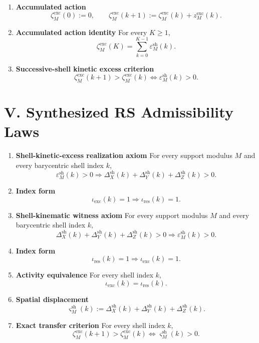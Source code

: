 \documentclass[11pt,letterpaper]{article}
\theoremstyle{plain}
\theoremstyle{definition}
\theoremstyle{remark}
\newcommand{\ExcIndex}{\iota}
\newcommand{\SpatDisp}{\varsigma}
\newcommand{\KinExcess}{\varepsilon}
\newcommand{\AccAction}{\zeta}
\begin{document}
\begin{enumerate}[resume]
\item \textbf{Accumulated action}
\[
\AccAction_M^{\mathrm{exc}}(0):=0,\qquad
\AccAction_M^{\mathrm{exc}}(k+1):=\AccAction_M^{\mathrm{exc}}(k)+z_M^{\mathrm{exc}}(k).
\]

\item \textbf{Accumulated action identity}
For every \(K\ge 1\),
\[
\AccAction_M^{\mathrm{exc}}(K)=\sum_{k=0}^{K-1}\KinExcess_M^{\mathrm{sh}}(k).
\]

\item \textbf{Successive-shell kinetic excess criterion}
\[
\AccAction_M^{\mathrm{exc}}(k+1)>\AccAction_M^{\mathrm{exc}}(k)
\iff
\KinExcess_M^{\mathrm{sh}}(k)>0.
\]
\end{enumerate}

\section*{V. Synthesized RS Admissibility Laws}

\begin{enumerate}[resume]
\item \textbf{Shell-kinetic-excess realization axiom}
For every support modulus \(M\) and every barycentric shell index \(k\),
\[
\KinExcess_M^{\mathrm{sh}}(k)>0
\Longrightarrow
\Delta_X^{\mathrm{sh}}(k)+\Delta_Y^{\mathrm{sh}}(k)+\Delta_Z^{\mathrm{sh}}(k)>0.
\]

\item \textbf{Index form}
\[
\ExcIndex_{\mathrm{exc}}(k)=1
\Longrightarrow
\ExcIndex_{\mathrm{res}}(k)=1.
\]

\item \textbf{Shell-kinematic witness axiom}
For every support modulus \(M\) and every barycentric shell index \(k\),
\[
\Delta_X^{\mathrm{sh}}(k)+\Delta_Y^{\mathrm{sh}}(k)+\Delta_Z^{\mathrm{sh}}(k)>0
\Longrightarrow
\KinExcess_M^{\mathrm{sh}}(k)>0.
\]

\item \textbf{Index form}
\[
\ExcIndex_{\mathrm{res}}(k)=1
\Longrightarrow
\ExcIndex_{\mathrm{exc}}(k)=1.
\]

\item \textbf{Activity equivalence}
For every shell index \(k\),
\[
\ExcIndex_{\mathrm{exc}}(k)=\ExcIndex_{\mathrm{res}}(k).
\]

\item \textbf{Spatial displacement}
\[
\SpatDisp_M^{\mathrm{sh}}(k):=
\Delta_X^{\mathrm{sh}}(k)+\Delta_Y^{\mathrm{sh}}(k)+\Delta_Z^{\mathrm{sh}}(k).
\]

\item \textbf{Exact transfer criterion}
For every shell index \(k\),
\[
\AccAction_M^{\mathrm{exc}}(k+1)>\AccAction_M^{\mathrm{exc}}(k)
\iff
\SpatDisp_M^{\mathrm{sh}}(k)>0.
\]
\end{enumerate}
\end{document}
